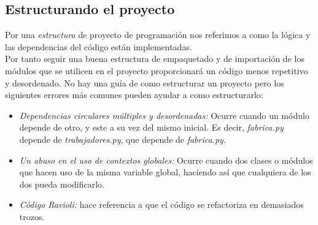 \subsection*{Estructurando el proyecto}
\label{subsec:structurePython}
Por una \emph{estructura} de proyecto de programación nos referimos a como la lógica y las dependencias del código están implementadas. \\
Por tanto seguir una buena estructura de empaquetado y de importación de los módulos que se utilicen en el proyecto proporcionará un código menos repetitivo y desordenado. No hay una guía de como estructurar un proyecto pero los siguientes errores más comunes pueden ayudar a  como estructurarlo:
\begin{itemize}
    \item \textit{Dependencias circulares múltiples y desordenadas:} Ocurre cuando un módulo depende de otro, y este a su vez del mismo inicial. Es decir, \textit{fabrica.py} depende de \textit{trabajadores.py}, que depende de \textit{fabrica.py}.
    \item \textit{Un abuso en el uso de contextos globales:} Ocurre cuando dos clases o módulos que hacen uso de la misma variable global, haciendo así que cualquiera de los dos pueda modificarlo.
    \item \textit{Código Ravioli:} hace referencia a que el código se refactoriza en demasiados trozos.
\end{itemize}

